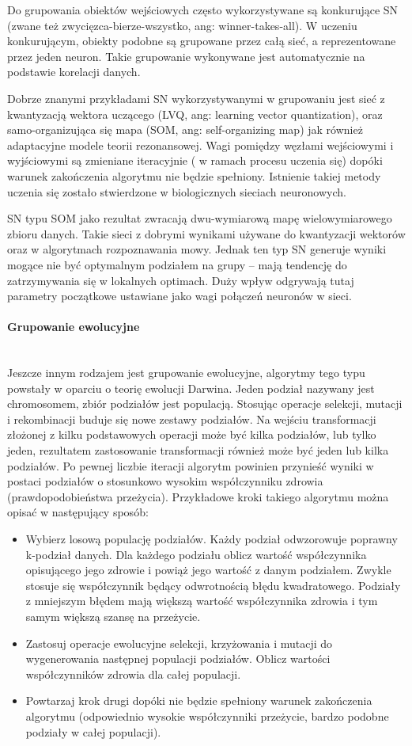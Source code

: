 \documentclass{article}
\newcommand{\myparagraph}[1]{\paragraph{#1}\mbox{}\\}
\begin{document}
Do grupowania obiektów wejściowych często wykorzystywane są konkurujące SN (zwane też zwycięzca-bierze-wszystko, ang: winner-takes-all). W uczeniu konkurującym, obiekty podobne są grupowane przez całą sieć, a reprezentowane przez jeden neuron. Takie grupowanie wykonywane jest automatycznie na podstawie korelacji danych\cite[5.7]{jain_clustering}.

Dobrze znanymi przykładami SN wykorzystywanymi w grupowaniu jest sieć z kwantyzacją wektora uczącego (LVQ, ang: learning vector quantization), oraz samo-organizująca się mapa (SOM, ang: self-organizing map) jak również adaptacyjne modele teorii rezonansowej. Wagi pomiędzy węzłami wejściowymi i wyjściowymi są zmieniane iteracyjnie ( w ramach procesu uczenia się) dopóki warunek zakończenia algorytmu nie będzie spełniony. Istnienie takiej metody uczenia się zostało stwierdzone w biologicznych sieciach neuronowych.

SN typu SOM jako rezultat zwracają dwu-wymiarową mapę wielowymiarowego zbioru danych. Takie sieci z dobrymi wynikami używane do kwantyzacji wektorów oraz w algorytmach rozpoznawania mowy. Jednak ten typ SN generuje wyniki mogące nie być optymalnym podziałem na grupy – mają tendencję do zatrzymywania się w lokalnych optimach. Duży wpływ odgrywają tutaj parametry początkowe ustawiane jako wagi połączeń neuronów w sieci.

\myparagraph{Grupowanie ewolucyjne}

Jeszcze innym rodzajem jest grupowanie ewolucyjne, algorytmy tego typu powstały w oparciu o teorię ewolucji Darwina. Jeden podział nazywany jest chromosomem, zbiór podziałów jest populacją. Stosując operacje selekcji, mutacji i rekombinacji buduje się nowe zestawy podziałów. Na wejściu transformacji złożonej z kilku podstawowych operacji może być kilka podziałów, lub tylko jeden,  rezultatem zastosowanie transformacji również może być jeden lub kilka podziałów. Po pewnej liczbie iteracji algorytm powinien przynieść wyniki w postaci podziałów o stosunkowo wysokim współczynniku zdrowia (prawdopodobieństwa przeżycia). Przykładowe kroki takiego algorytmu można opisać w następujący sposób: 

\begin{itemize}
	\item Wybierz losową populację podziałów. Każdy podział odwzorowuje poprawny k-podział danych. Dla każdego podziału oblicz wartość współczynnika opisującego jego zdrowie i powiąż jego wartość z danym podziałem. Zwykle stosuje się współczynnik będący odwrotnością błędu kwadratowego. Podziały z mniejszym błędem mają większą wartość współczynnika zdrowia i tym samym większą szansę na przeżycie.
	\item Zastosuj operacje ewolucyjne selekcji, krzyżowania i mutacji do wygenerowania następnej populacji podziałów. Oblicz wartości współczynników zdrowia dla całej populacji. 
	\item Powtarzaj krok drugi dopóki nie będzie spełniony warunek zakończenia algorytmu (odpowiednio wysokie współczynniki przeżycie, bardzo podobne podziały w całej populacji).
\end{itemize}
\end{document}
